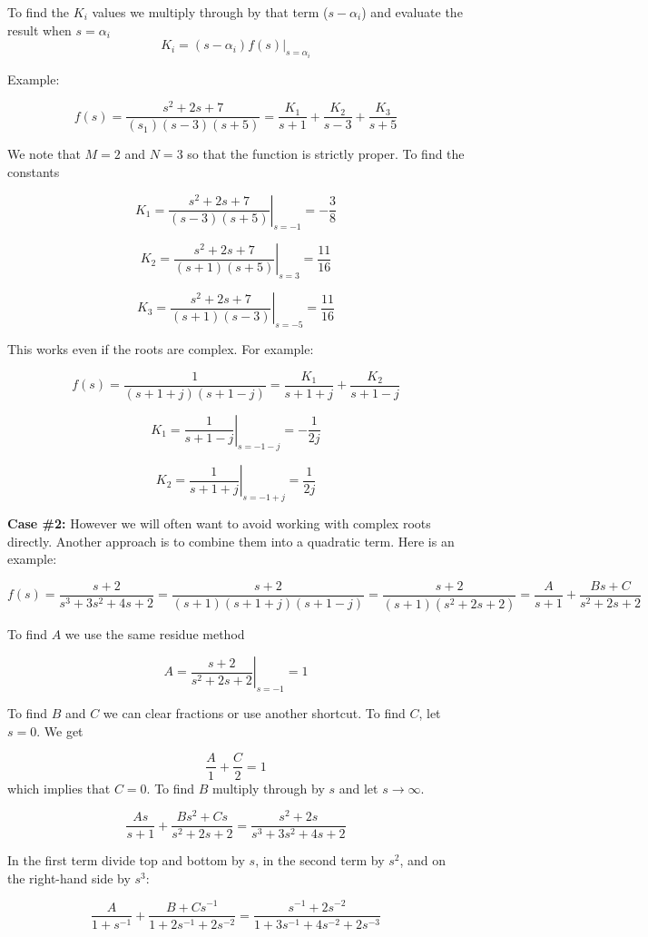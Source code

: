 \documentclass{article}
\begin{document}
To find the $K_i$ values we multiply through by that term ($s-\alpha_i$) and evaluate the result when $s = \alpha_i$
\[
K_i = \left. (s-\alpha_i)f(s) \right|_{s = \alpha_i} 
\]

Example:

\[
f(s) = \frac{s^2 + 2s + 7}{(s_1)(s-3)(s+5)} = \frac{K_1}{s+1} + \frac{K_2}{s-3} + \frac{K_3}{s+5}
\]

We note that $M = 2$ and $N = 3$ so that the function is strictly proper. To find the constants

\[
K_1 = \left. \frac{s^2 + 2s + 7}{(s-3)(s+5)} \right|_{s = -1} = -\frac{3}{8}
\]

\[
K_2 = \left. \frac{s^2 + 2s + 7}{(s+1)(s+5)} \right|_{s = 3} = \frac{11}{16}
\]

\[
K_3 = \left. \frac{s^2 + 2s + 7}{(s+1)(s-3)} \right|_{s = -5} = \frac{11}{16}
\]

This works even if the roots are complex. For example:

\[
f(s) = \frac{1}{(s + 1 + j)(s + 1 -j)} = \frac{K_1}{s + 1 + j} + \frac{K_2}{s + 1 -j}
\]

\[
K_1 = \left. \frac{1}{s + 1 - j} \right|_{s = -1-j} = -\frac{1}{2j}
\]

\[
K_2 = \left. \frac{1}{s + 1 + j} \right|_{s = -1+j} = \frac{1}{2j}
\]

\textbf{Case \#2:} However we will often want to avoid working with complex roots directly. Another approach is to combine them into a quadratic term. Here is an example:

\[
f(s) = \frac{s+2}{s^3 + 3s^2 + 4s + 2} = \frac{s+2}{(s+1)(s+1 +j)(s +1 -j)} = \frac{s+2}{(s+1)(s^2 +2s + 2)} = \frac{A}{s+1} + \frac{Bs + C}{s^2 + 2s + 2}
\]

To find $A$ we use the same residue method

\[
A = \left. \frac{s+2}{s^2 + 2s + 2} \right|_{s = -1} = 1
\]

To find $B$ and $C$ we can clear fractions or use another shortcut. To find $C$, let $s = 0$. We get

\[
\frac{A}{1} + \frac{C}{2} = 1
\]
which implies that $C = 0$. To find $B$ multiply through by $s$ and let $s\rightarrow \infty$.

\[
\frac{As}{s+1} + \frac{Bs^2 + Cs}{s^2 + 2s + 2} = \frac{s^2 + 2s}{s^3 + 3s^2 + 4s + 2}
\]

In the first term divide top and bottom by $s$, in the second term by $s^2$, and on the right-hand side by $s^3$:


\[
\frac{A}{1+s^{-1}} + \frac{B + Cs^{-1}}{1 + 2s^{-1} + 2s^{-2}} = \frac{s^{-1} + 2s^{-2}}{1 + 3s^{-1} + 4s^{-2} + 2s^{-3}}
\]
\end{document}
